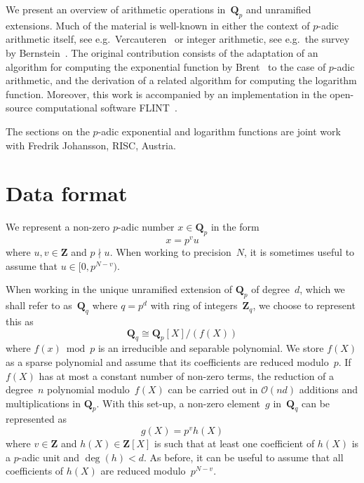 We present an overview of arithmetic operations in~$\mathbf{Q}_p$ 
and unramified extensions.  Much of the material is well-known in 
either the context of $p$-adic arithmetic itself, see e.g.\ 
Vercauteren~\citep[\S 12]{HEHCC2005} or integer arithmetic, 
see e.g.\ the survey by Bernstein~\citep{Bernstein2008}. 
The original contribution consists of the adaptation of an algorithm 
for computing the exponential function by Brent~\citep{Brent1976} 
to the case of $p$-adic arithmetic, and the derivation of a related 
algorithm for computing the logarithm function.  Moreover, this 
work is accompanied by an implementation in the open-source computational 
software {\sc FLINT}~\citep{FLINT}.

The sections on the $p$-adic exponential and logarithm functions 
are joint work with Fredrik Johansson, RISC, Austria.

\section{Data format}

We represent a non-zero $p$-adic number $x \in \mathbf{Q}_p$ in the form 
\begin{equation*}
x = p^v u
\end{equation*}
where $u, v \in \mathbf{Z}$ and $p \nmid u$.  When working to precision~$N$, 
it is sometimes useful to assume that $u \in [0,p^{N-v})$.

When working in the unique unramified extension of $\mathbf{Q}_p$ of 
degree~$d$, which we shall refer to as~$\mathbf{Q}_q$ where $q = p^d$ 
with ring of integers~$\mathbf{Z}_q$, we choose to represent this as 
\begin{equation*}
\mathbf{Q}_q \cong \mathbf{Q}_p[X] / (f(X))
\end{equation*}
where $f(x) \bmod p$ is an irreducible and separable polynomial.  We store 
$f(X)$ as a sparse polynomial and assume that its coefficients are 
reduced modulo~$p$.  If $f(X)$ has at most a constant number of non-zero 
terms, the reduction of a degree~$n$ polynomial modulo~$f(X)$ can be carried 
out in $\mathcal{O}(nd)$ additions and multiplications in $\mathbf{Q}_p$.  
With this set-up, a non-zero element~$g$ in~$\mathbf{Q}_q$ can be represented 
as 
\begin{equation*}
g(X) = p^v h(X)
\end{equation*}
where $v \in \mathbf{Z}$ and $h(X) \in \mathbf{Z}[X]$ is such that at least 
one coefficient of $h(X)$ is a $p$-adic unit and $\deg(h) < d$.  As before, 
it can be useful to assume that all coefficients of $h(X)$ are reduced 
modulo~$p^{N-v}$.


